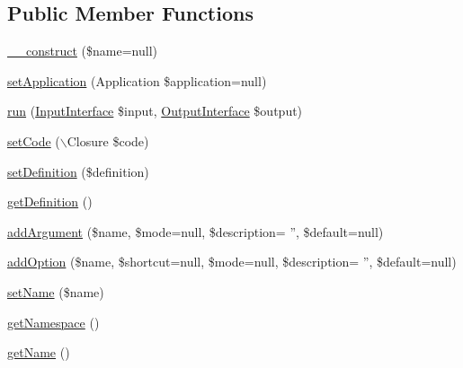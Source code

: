 \subsection*{Public Member Functions}
\begin{DoxyCompactItemize}
\item 
\hyperlink{class_symfony_1_1_components_1_1_console_1_1_command_1_1_command_aa7843dae8184afc5ab27814533e12ba8}{\_\-\_\-construct} (\$name=null)
\item 
\hyperlink{class_symfony_1_1_components_1_1_console_1_1_command_1_1_command_ac08817b122da6241cfda88dab20d1580}{setApplication} (Application \$application=null)
\item 
\hyperlink{class_symfony_1_1_components_1_1_console_1_1_command_1_1_command_acc17fc4b2880856deb16661a443fe08e}{run} (\hyperlink{interface_symfony_1_1_components_1_1_console_1_1_input_1_1_input_interface}{InputInterface} \$input, \hyperlink{interface_symfony_1_1_components_1_1_console_1_1_output_1_1_output_interface}{OutputInterface} \$output)
\item 
\hyperlink{class_symfony_1_1_components_1_1_console_1_1_command_1_1_command_a9c05327374b79732c328c6f7811c8497}{setCode} ($\backslash$Closure \$code)
\item 
\hyperlink{class_symfony_1_1_components_1_1_console_1_1_command_1_1_command_a633d4b963ba13775519a92a3c34780ec}{setDefinition} (\$definition)
\item 
\hyperlink{class_symfony_1_1_components_1_1_console_1_1_command_1_1_command_ada012e6c80eda0d807425b598b1dc611}{getDefinition} ()
\item 
\hyperlink{class_symfony_1_1_components_1_1_console_1_1_command_1_1_command_a04bb0142af0b8685a0b99955fce77569}{addArgument} (\$name, \$mode=null, \$description= '', \$default=null)
\item 
\hyperlink{class_symfony_1_1_components_1_1_console_1_1_command_1_1_command_af8a9f1b5fb3d9ba9ad9dc9564fe95c75}{addOption} (\$name, \$shortcut=null, \$mode=null, \$description= '', \$default=null)
\item 
\hyperlink{class_symfony_1_1_components_1_1_console_1_1_command_1_1_command_a2fe666694997d047711d7653eca2f132}{setName} (\$name)
\item 
\hyperlink{class_symfony_1_1_components_1_1_console_1_1_command_1_1_command_a2614df64646ac71b70b1e1074258052b}{getNamespace} ()
\item 
\hyperlink{class_symfony_1_1_components_1_1_console_1_1_command_1_1_command_a3d0963e68bb313b163a73f2803c64600}{getName} ()

\end{DoxyCompactItemize}
